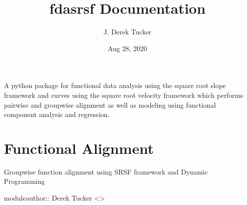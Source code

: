 \documentclass[letterpaper,10pt,english]{sphinxmanual}
\title{fdasrsf Documentation}
\date{Aug 28, 2020}
\author{J. Derek Tucker}
\begin{document}
\pagestyle{empty}
\sphinxmaketitle
\pagestyle{plain}
\sphinxtableofcontents
\pagestyle{normal}
\label{\detokenize{index::doc}}


A python package for functional data analysis using the square root
slope framework and curves using the square root velocity framework
which performs pair\sphinxhyphen{}wise and group\sphinxhyphen{}wise alignment as well as modeling
using functional component analysis and regression.


\chapter{Functional Alignment}
\label{\detokenize{time_warping:module-time_warping}}\label{\detokenize{time_warping:functional-alignment}}\label{\detokenize{time_warping::doc}}
Group\sphinxhyphen{}wise function alignment using SRSF framework and Dynamic Programming

moduleauthor:: Derek Tucker \textless{}\textgreater{}
\end{document}
